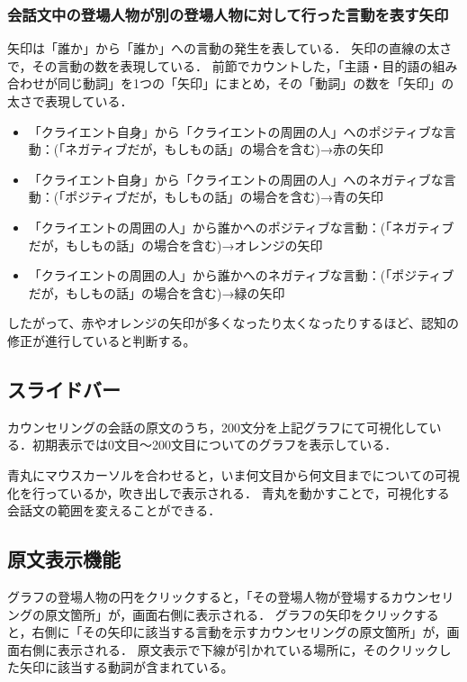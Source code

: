 \documentclass[shuuron]{kuee}
\begin{document}
\subsubsection{会話文中の登場人物が別の登場人物に対して行った言動を表す矢印}

矢印は「誰か」から「誰か」への言動の発生を表している．
矢印の直線の太さで，その言動の数を表現している．
前節でカウントした，「主語・目的語の組み合わせが同じ動詞」を1つの「矢印」にまとめ，その「動詞」の数を「矢印」の太さで表現している．


\begin{itemize}
  \item 「クライエント自身」から「クライエントの周囲の人」へのポジティブな言動：(「ネガティブだが，もしもの話」の場合を含む)→赤の矢印
  \item 「クライエント自身」から「クライエントの周囲の人」へのネガティブな言動：(「ポジティブだが，もしもの話」の場合を含む)→青の矢印
  \item 「クライエントの周囲の人」から誰かへのポジティブな言動：(「ネガティブだが，もしもの話」の場合を含む)→オレンジの矢印
  \item 「クライエントの周囲の人」から誰かへのネガティブな言動：(「ポジティブだが，もしもの話」の場合を含む)→緑の矢印
\end{itemize}

したがって、赤やオレンジの矢印が多くなったり太くなったりするほど、認知の修正が進行していると判断する。

\subsection{スライドバー}

カウンセリングの会話の原文のうち，200文分を上記グラフにて可視化している．初期表示では0文目〜200文目についてのグラフを表示している．

青丸にマウスカーソルを合わせると，いま何文目から何文目までについての可視化を行っているか，吹き出しで表示される．
青丸を動かすことで，可視化する会話文の範囲を変えることができる．


\subsection{原文表示機能}

グラフの登場人物の円をクリックすると，「その登場人物が登場するカウンセリングの原文箇所」が，画面右側に表示される．
グラフの矢印をクリックすると，右側に「その矢印に該当する言動を示すカウンセリングの原文箇所」が，画面右側に表示される．
原文表示で下線が引かれている場所に，そのクリックした矢印に該当する動詞が含まれている。
\end{document}
